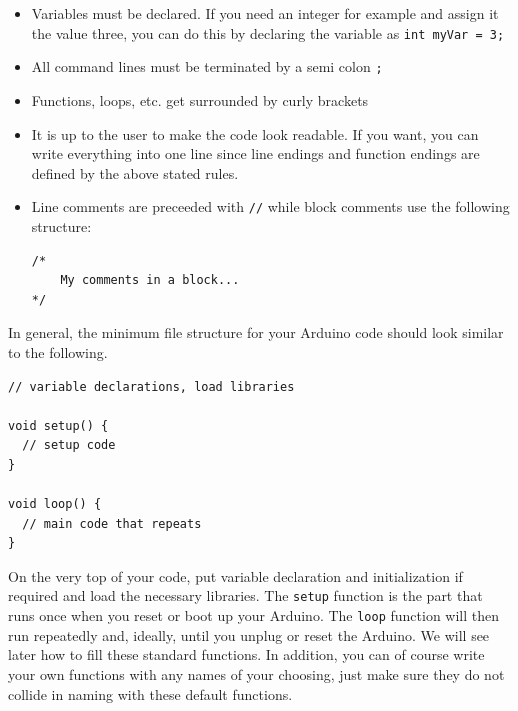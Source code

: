 \begin{itemize}
    \item Variables must be declared. If you need an integer for example and assign it the value three, you can do this by declaring the variable as \lstinline{int myVar = 3;}
    \item All command lines must be terminated by a semi colon \lstinline{;}
    \item Functions, loops, etc. get surrounded by curly brackets
    \item It is up to the user to make the code look readable. If you want, you can write everything into one line since line endings and function endings are defined by the above stated rules.
    \item Line comments are preceeded with \lstinline{//} while block comments use the following structure:
    \begin{lstlisting}
/*
    My comments in a block...
*/
    \end{lstlisting}
\end{itemize}

In general, the minimum file structure for your Arduino code should look similar to the following.
\begin{lstlisting}
// variable declarations, load libraries

void setup() {
  // setup code
}

void loop() {
  // main code that repeats
}
\end{lstlisting}
On the very top of your code, put variable declaration and initialization if required and load the necessary libraries. The \lstinline{setup} function is the part that runs once when you reset or boot up your Arduino. The \lstinline{loop} function will then run repeatedly and, ideally, until you unplug or reset the Arduino. We will see later how to fill these standard functions. In addition, you can of course write your own functions with any names of your choosing, just make sure they do not collide in naming with these default functions. 


